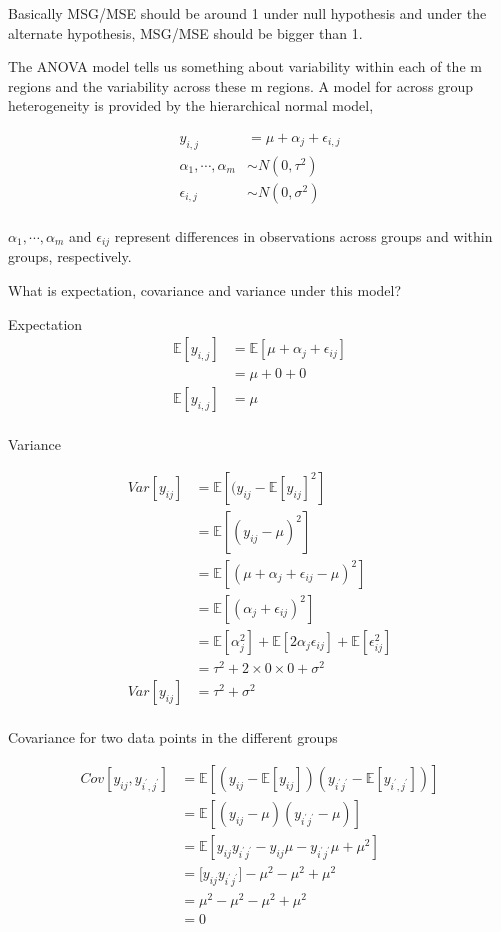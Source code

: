 \documentclass[12pt,]{article}
\begin{document}
Basically MSG/MSE should be around 1 under null hypothesis and under the
alternate hypothesis, MSG/MSE should be bigger than 1.

The ANOVA model tells us something about variability within each of the
m regions and the variability across these m regions. A model for across
group heterogeneity is provided by the hierarchical normal model,

\[
\begin{aligned}
y_{i,j} &= \mu + \alpha_j + \epsilon_{i,j}\\
\alpha_1, \cdots, \alpha_m &\sim N(0, \tau^2)\\
\epsilon_{i,j} &\sim N(0, \sigma^2)\\
\end{aligned}
\]

\(\alpha_1, \cdots, \alpha_m\) and \(\epsilon_{ij}\) represent
differences in observations across groups and within groups,
respectively.

What is expectation, covariance and variance under this model?

Expectation \[
\begin{aligned}
\mathbb{E}[y_{i,j}] &= \mathbb{E}[\mu + \alpha_j + \epsilon_{ij}]\\
&= \mu + 0 + 0 \\
\mathbb{E}[y_{i,j}]&= \mu\\
\end{aligned}
\]

Variance

\[
\begin{aligned}
Var[y_{ij}] &= \mathbb{E}[(y_{ij} - \mathbb{E}[y_{ij}]^2]\\
&= \mathbb{E}[(y_{ij} - \mu)^2]\\
&= \mathbb{E}[(\mu + \alpha_j + \epsilon_{ij} - \mu)^2]\\
&= \mathbb{E}[(\alpha_j + \epsilon_{ij})^2]\\
&= \mathbb{E}[\alpha_j^2] + \mathbb{E}[2\alpha_j\epsilon_{ij}] + \mathbb{E}[\epsilon_{ij}^2]\\
&= \tau^2 +  2\times 0\times 0 + \sigma^2\\
Var[y_{ij}]&= \tau^2 + \sigma^2\\
\end{aligned}
\]

Covariance for two data points in the different groups

\[
\begin{aligned}
Cov[y_{ij}, y_{i^\prime, j^\prime}] &= \mathbb{E}[(y_{ij} - \mathbb{E}[y_{ij}])(y_{i^\prime j^\prime} - \mathbb{E}[y_{i^\prime, j^\prime}])]\\
&=\mathbb{E}[(y_{ij} - \mu)(y_{i^\prime j^\prime} - \mu)]\\
&= \mathbb{E}[y_{ij}y_{i^\prime j^\prime} - y_{ij}\mu  - y_{i^\prime j^\prime}\mu + \mu^2]\\
&= \mathbb[y_{ij}y_{i^\prime j^\prime} ] - \mu^2 - \mu^2 + \mu^2\\
&= \mu^2 - \mu^2 - \mu^2 + \mu^2\\
&= 0
\end{aligned}
\]
\end{document}
